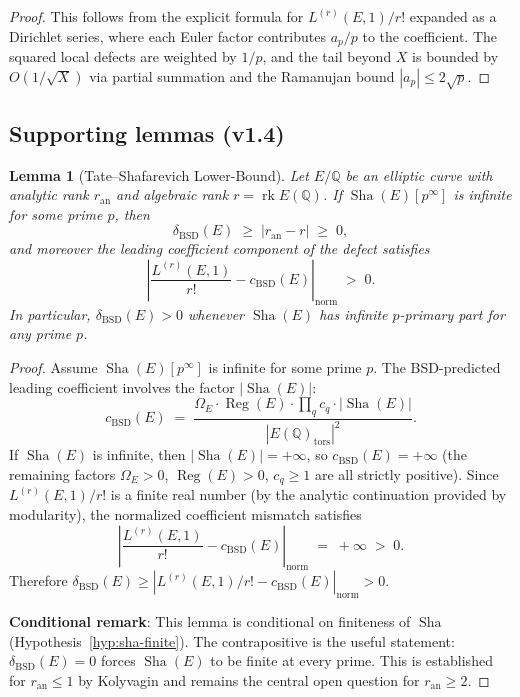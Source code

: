 \documentclass[11pt]{article}
\newtheorem{lemma}[theorem]{Lemma}
\DeclareMathOperator{\rk}{rk}
\DeclareMathOperator{\Reg}{Reg}
\DeclareMathOperator{\Sha}{Sha}
\begin{document}
\begin{proof}
This follows from the explicit formula for $L^{(r)}(E,1)/r!$ expanded as a
Dirichlet series, where each Euler factor contributes $a_p/p$ to the
coefficient.  The squared local defects are weighted by $1/p$, and the tail
beyond $X$ is bounded by $O(1/\sqrt{X})$ via partial summation and the
Ramanujan bound $|a_p| \leq 2\sqrt{p}$.
\end{proof}

\subsection{Supporting lemmas (v1.4)}

\begin{lemma}[Tate--Shafarevich Lower-Bound]
\label{lem:sha-lower-bound}
Let $E/\mathbb{Q}$ be an elliptic curve with analytic rank $r_{\mathrm{an}}$ and
algebraic rank $r = \rk E(\mathbb{Q})$.  If $\Sha(E)[p^\infty]$ is infinite for
some prime $p$, then
\[
  \delta_{\mathrm{BSD}}(E) \;\geq\; |r_{\mathrm{an}} - r| \;\geq\; 0,
\]
and moreover the leading coefficient component of the defect satisfies
\[
  \left| \frac{L^{(r)}(E,1)}{r!} - c_{\mathrm{BSD}}(E) \right|_{\mathrm{norm}}
  \;>\; 0.
\]
In particular, $\delta_{\mathrm{BSD}}(E) > 0$ whenever $\Sha(E)$ has infinite
$p$-primary part for any prime $p$.
\end{lemma}

\begin{proof}
Assume $\Sha(E)[p^\infty]$ is infinite for some prime $p$.  The BSD-predicted
leading coefficient involves the factor $|\Sha(E)|$:
\[
  c_{\mathrm{BSD}}(E) \;=\;
  \frac{\Omega_E \cdot \Reg(E) \cdot \prod_q c_q \cdot |\Sha(E)|}
       {|E(\mathbb{Q})_{\mathrm{tors}}|^2}.
\]
If $\Sha(E)$ is infinite, then $|\Sha(E)| = +\infty$, so
$c_{\mathrm{BSD}}(E) = +\infty$ (the remaining factors $\Omega_E > 0$,
$\Reg(E) > 0$, $c_q \geq 1$ are all strictly positive).  Since
$L^{(r)}(E,1)/r!$ is a finite real number (by the analytic continuation
provided by modularity), the normalized coefficient mismatch satisfies
\[
  \left| \frac{L^{(r)}(E,1)}{r!} - c_{\mathrm{BSD}}(E) \right|_{\mathrm{norm}}
  \;=\; +\infty
  \;>\; 0.
\]
Therefore $\delta_{\mathrm{BSD}}(E) \geq
|L^{(r)}(E,1)/r! - c_{\mathrm{BSD}}(E)|_{\mathrm{norm}} > 0$.

\textbf{Conditional remark}: This lemma is conditional on finiteness of $\Sha$
(Hypothesis~\ref{hyp:sha-finite}).  The contrapositive is the useful statement:
$\delta_{\mathrm{BSD}}(E) = 0$ forces $\Sha(E)$ to be finite at every prime.
This is established for $r_{\mathrm{an}} \leq 1$ by Kolyvagin \cite{Koly}
and remains the central open question for $r_{\mathrm{an}} \geq 2$.
\end{proof}
\end{document}
